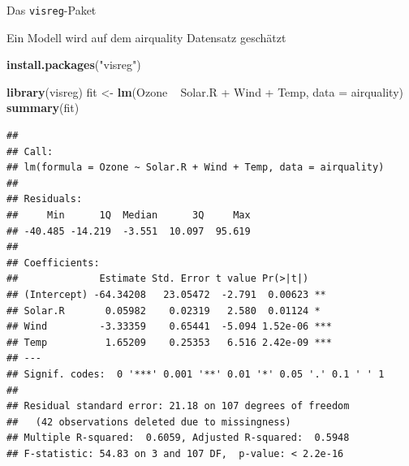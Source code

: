 \documentclass[ignorenonframetext,]{beamer}
\newenvironment{Shaded}{}{}
\newcommand{\KeywordTok}[1]{\textcolor[rgb]{0.00,0.44,0.13}{\textbf{{#1}}}}
\newcommand{\DataTypeTok}[1]{\textcolor[rgb]{0.56,0.13,0.00}{{#1}}}
\newcommand{\StringTok}[1]{\textcolor[rgb]{0.25,0.44,0.63}{{#1}}}
\newcommand{\NormalTok}[1]{{#1}}
\begin{document}
\begin{frame}[fragile]{Das \texttt{visreg}-Paket}

Ein Modell wird auf dem airquality Datensatz geschätzt

\begin{Shaded}
\begin{Highlighting}[]
\KeywordTok{install.packages}\NormalTok{(}\StringTok{"visreg"}\NormalTok{)}
\end{Highlighting}
\end{Shaded}

\begin{Shaded}
\begin{Highlighting}[]
\KeywordTok{library}\NormalTok{(visreg)}
\NormalTok{fit <-}\StringTok{ }\KeywordTok{lm}\NormalTok{(Ozone ~}\StringTok{ }\NormalTok{Solar.R +}\StringTok{ }\NormalTok{Wind +}\StringTok{ }\NormalTok{Temp, }\DataTypeTok{data =} \NormalTok{airquality)}
\KeywordTok{summary}\NormalTok{(fit)}
\end{Highlighting}
\end{Shaded}

\begin{verbatim}
## 
## Call:
## lm(formula = Ozone ~ Solar.R + Wind + Temp, data = airquality)
## 
## Residuals:
##     Min      1Q  Median      3Q     Max 
## -40.485 -14.219  -3.551  10.097  95.619 
## 
## Coefficients:
##              Estimate Std. Error t value Pr(>|t|)    
## (Intercept) -64.34208   23.05472  -2.791  0.00623 ** 
## Solar.R       0.05982    0.02319   2.580  0.01124 *  
## Wind         -3.33359    0.65441  -5.094 1.52e-06 ***
## Temp          1.65209    0.25353   6.516 2.42e-09 ***
## ---
## Signif. codes:  0 '***' 0.001 '**' 0.01 '*' 0.05 '.' 0.1 ' ' 1
## 
## Residual standard error: 21.18 on 107 degrees of freedom
##   (42 observations deleted due to missingness)
## Multiple R-squared:  0.6059, Adjusted R-squared:  0.5948 
## F-statistic: 54.83 on 3 and 107 DF,  p-value: < 2.2e-16
\end{verbatim}

\end{frame}
\end{document}
